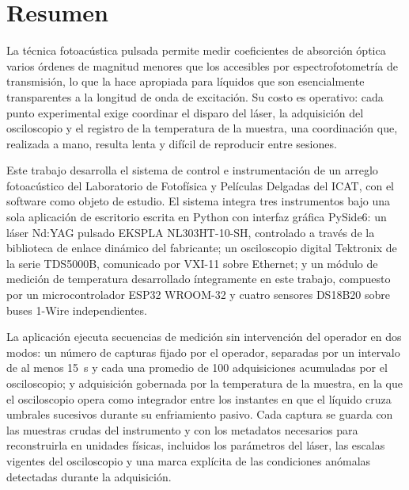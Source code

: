 \chapter*{Resumen}

La técnica fotoacústica pulsada permite medir coeficientes de absorción
óptica varios órdenes de magnitud menores que los accesibles por
espectrofotometría de transmisión, lo que la hace apropiada para
líquidos que son esencialmente transparentes a la longitud de onda de
excitación. Su costo es operativo: cada punto experimental exige
coordinar el disparo del láser, la adquisición del osciloscopio y el
registro de la temperatura de la muestra, una coordinación que,
realizada a mano, resulta lenta y difícil de reproducir entre sesiones.

Este trabajo desarrolla el sistema de control e instrumentación de un
arreglo fotoacústico del Laboratorio de Fotofísica y Películas Delgadas
del ICAT, con el software como objeto de estudio. El sistema integra
tres instrumentos bajo una sola aplicación de escritorio escrita en
Python con interfaz gráfica PySide6: un láser Nd:YAG pulsado EKSPLA
NL303HT-10-SH, controlado a través de la biblioteca de enlace dinámico
del fabricante; un osciloscopio digital Tektronix de la serie TDS5000B,
comunicado por VXI-11 sobre Ethernet; y un módulo de medición de
temperatura desarrollado íntegramente en este trabajo, compuesto por un
microcontrolador ESP32 WROOM-32 y cuatro sensores DS18B20 sobre buses
1-Wire independientes.

La aplicación ejecuta secuencias de medición sin intervención del
operador en dos modos: un número de capturas fijado por el operador,
separadas por un intervalo de al menos \SI{15}{\second} y cada una
promedio de 100 adquisiciones acumuladas por el osciloscopio; y
adquisición gobernada por la temperatura de la muestra, en la que el
osciloscopio opera como integrador entre los instantes en que el
líquido cruza umbrales sucesivos durante su enfriamiento pasivo. Cada
captura se guarda con las muestras crudas del instrumento y con los
metadatos necesarios para reconstruirla en unidades físicas, incluidos
los parámetros del láser, las escalas vigentes del osciloscopio y una
marca explícita de las condiciones anómalas detectadas durante la
adquisición.

